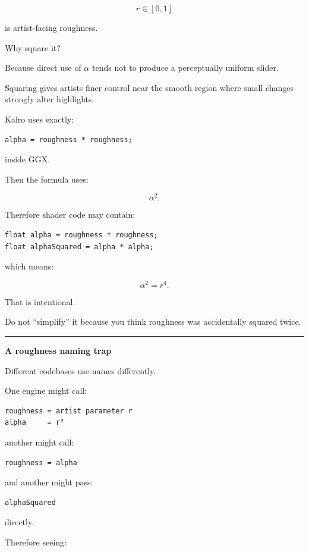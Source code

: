 \[
r\in[0,1]
\]

is artist-facing roughness.

Why square it?

Because direct use of \(\alpha\) tends not to produce a perceptually uniform slider.

Squaring gives artists finer control near the smooth region where small changes strongly alter highlights.

Kairo uses exactly:

\begin{verbatim}
alpha = roughness * roughness;
\end{verbatim}

inside GGX.

Then the formula uses:

\[
\alpha^2.
\]

Therefore shader code may contain:

\begin{verbatim}
float alpha = roughness * roughness;
float alphaSquared = alpha * alpha;
\end{verbatim}

which means:

\[
\alpha^2=r^4.
\]

That is intentional.

Do not ``simplify'' it because you think roughness was accidentally squared twice.

\begin{center}\rule{0.5\linewidth}{0.5pt}\end{center}

\textbf{A roughness naming trap}

Different codebases use names differently.

One engine might call:

\begin{verbatim}
roughness = artist parameter r
alpha     = r²
\end{verbatim}

another might call:

\begin{verbatim}
roughness = alpha
\end{verbatim}

and another might pass:

\begin{verbatim}
alphaSquared
\end{verbatim}

directly.

Therefore seeing:

